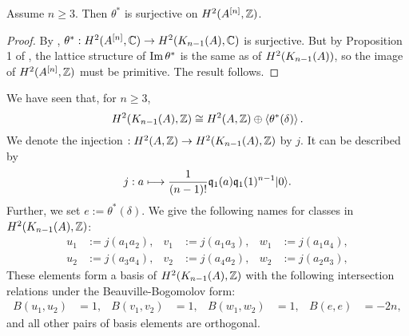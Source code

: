 \begin{proposition}\label{H2Sur} Assume $n\geq 3$. Then
$\theta^*$ is surjective on $H^2(A\hilb{n},\Z)$.
\end{proposition}
\begin{proof}
By \cite[Sect.~7]{Beauville}, $\theta^{\ast} : H^2(A\hilb{n},\C) \rightarrow H^2(\kum{A}{n-1},\C)$ is surjective. 
But by Proposition 1 of \cite{Britze}, the lattice structure of $\im \theta^*$ is the same as of $H^2(\kum{A}{n-1})$, so the image of $H^2(A\hilb{n},\Z)$ must be primitive. The result follows.
\end{proof}
\begin{notation}\label{BasisH2KA}
 We have seen that, for $n\geq 3$,
 $$
 H^2(\kum{A}{n-1},\Z) \cong H^2(A,\Z) \oplus\left<\theta^*(\delta)\right>.
 $$
We denote the injection $ : H^2(A,\Z) \rightarrow H^2(\kum{A}{n-1},\Z)$ by $j$. It can be described by 
$$
j : a \longmapsto \frac{1}{(n-1)!}\q_1(a)\q_1(1)^{n-1}\vac.
$$ 
Further, we set $e:=\theta^*(\delta)$. We give the following names for classes in $H^2(\kum{A}{n-1},\Z)$:
\begin{align*}
u_1 &:= j(a_1 a_2), & v_1 &:= j(a_1 a_3), & w_1 &:= j(a_1 a_4), \\ 
u_2 &:= j(a_3 a_4), & v_2 &:= j(a_4 a_2), & w_2 &:= j(a_2 a_3),
\end{align*}
These elements form a basis of $H^2(\kum{A}{n-1},\Z)$ with the following intersection relations under the Beauville-Bogomolov form:
\begin{align*}
B(u_1,u_2) &= 1, & B(v_1,v_2) &= 1, & B(w_1,w_2) &= 1,  &
B(e,e)&= -2n,
\end{align*}
and all other pairs of basis elements are orthogonal.
\end{notation}

